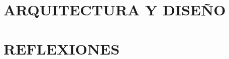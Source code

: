 \documentclass[openany,12pt,letterpaper]{book}
\begin{document}
	\part{ARQUITECTURA Y DISEÑO}
	
	
	
	
	
	
	

	\part{REFLEXIONES}
	
	
	
	
	
	
\end{document}
